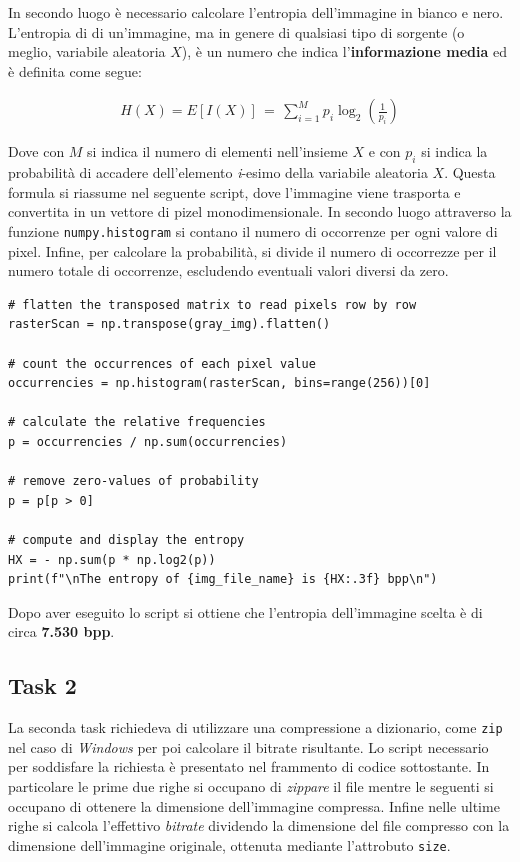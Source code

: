 \FloatBarrier\noindent In secondo luogo è necessario calcolare l'entropia dell'immagine in bianco e nero. L'entropia di di un'immagine, ma in genere di qualsiasi tipo di sorgente (o meglio, variabile aleatoria $X$), è un numero che indica l'\textbf{informazione media} ed è definita come segue:

\begin{gather*}
    H(X) = E[I(X)] \, = \, \sum_{i = 1}^M p_i\log_2\left( \frac{1}{p_i} \right)
\end{gather*}

\noindent Dove con $M$ si indica il numero di elementi nell'insieme $X$ e con $p_i$ si indica la probabilità di accadere dell'elemento \textit{i}-esimo della variabile aleatoria $X$. Questa formula si riassume nel seguente script, dove l'immagine viene trasporta e convertita in un vettore di pizel monodimensionale. In secondo luogo attraverso la funzione \texttt{numpy.histogram} si contano il numero di occorrenze per ogni valore di pixel. Infine, per calcolare la probabilità, si divide il numero di occorrezze per il numero totale di occorrenze, escludendo eventuali valori diversi da zero.


\begin{lstlisting}
# flatten the transposed matrix to read pixels row by row
rasterScan = np.transpose(gray_img).flatten()

# count the occurrences of each pixel value
occurrencies = np.histogram(rasterScan, bins=range(256))[0]

# calculate the relative frequencies
p = occurrencies / np.sum(occurrencies)

# remove zero-values of probability
p = p[p > 0]

# compute and display the entropy
HX = - np.sum(p * np.log2(p))
print(f"\nThe entropy of {img_file_name} is {HX:.3f} bpp\n")
\end{lstlisting}

\noindent Dopo aver eseguito lo script si ottiene che l'entropia dell'immagine scelta è di circa \textbf{7.530 bpp}.


\subsection*{Task 2}
La seconda task richiedeva di utilizzare una compressione a dizionario, come \texttt{zip} nel caso di \textsl{Windows} per poi calcolare il bitrate risultante. Lo script necessario per soddisfare la richiesta è presentato nel frammento di codice sottostante. In particolare le prime due righe si occupano di \textsl{zippare} il file mentre le seguenti si occupano di ottenere la dimensione dell'immagine compressa. Infine nelle ultime righe si calcola l'effettivo \textsl{bitrate} dividendo la dimensione del file compresso con la dimensione dell'immagine originale, ottenuta mediante l'attrobuto \texttt{size}.

